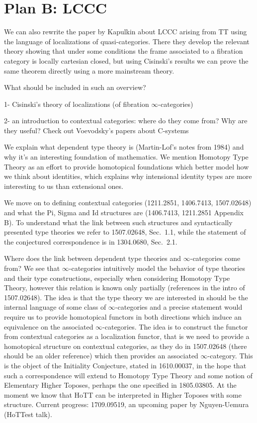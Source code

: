 \documentclass[a4paper,12pt]{scrartcl}
\begin{document}
\section{Plan B: LCCC}

We can also rewrite the paper by Kapulkin about LCCC arising from TT using the language of localizations of quasi-categories. There they develop the relevant theory showing that under some conditions the frame associated to a fibration category is locally cartesian closed, but using Cisinski's results we can prove the same theorem directly using a more mainstream theory.

What should be included in such an overview?

1- Cisinski's theory of localizations (of fibration $\infty$-categories)

2- an introduction to contextual categories: where do they come from? Why are they useful? Check out Voevodsky's papers about C-systems

We explain what dependent type theory is (Martin-Lof's notes from 1984) and why
it's an interesting foundation of mathematics. We mention Homotopy Type Theory
as an effort to provide homotopical foundations which better model how we think
about identities, which explains why intensional identity types are more
interesting to us than extensional ones.

We move on to defining contextual categories (1211.2851, 1406.7413, 1507.02648)
and what
the Pi, Sigma and Id structures are (1406.7413, 1211.2851 Appendix B). To
understand what the link between such structures and syntactically presented
type theories we refer to 1507.02648, Sec.\ 1.1, while the statement of the
conjectured correspondence is in 1304.0680, Sec.\ 2.1.

Where does the link between dependent type theories and $\infty$-categories come
from? We see that $\infty$-categories intuitively model the behavior of type
theories and their type constructions, especially when considering Homotopy Type
Theory, however this relation is known only
partially (references in the intro of 1507.02648). The idea is that the type
theory we are interested in should be the internal language of some class of
$\infty$-categories and a precise statement would require us to provide
homotopical functors in both directions which induce an equivalence on the
associated $\infty$-categories. The idea is to construct the
functor from contextual categories as a localization functor, that is we need to
provide a homotopical structure on contextual categories, as they do in
1507.02648 (there should be an older reference) which then provides an
associated $\infty$-category. This is the object of the Initiality Conjecture,
stated in 1610.00037, in the hope that such a correspondence will extend to
Homotopy Type Theory and some notion of Elementary Higher Toposes, perhaps the
one specified in 1805.03805. At the moment we know that HoTT can be interpreted
in Higher Toposes with some structure. Current progress: 1709.09519, an upcoming
paper by Nguyen-Uemura (HoTTest talk).
\end{document}

